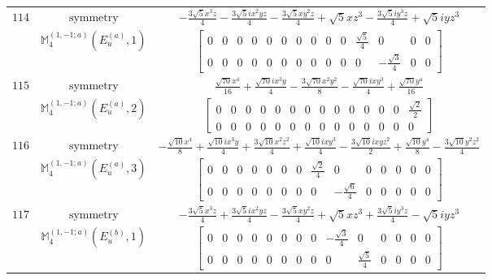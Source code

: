 \documentclass[fleqn,8pt,landscape]{jsarticle}
\begin{document}
\begin{longtable}{ccc}
$ 114 $ & $ \text{symmetry} $ & $ - \frac{3 \sqrt{5} x^{3} z}{4} - \frac{3 \sqrt{5} i x^{2} y z}{4} - \frac{3 \sqrt{5} x y^{2} z}{4} + \sqrt{5} x z^{3} - \frac{3 \sqrt{5} i y^{3} z}{4} + \sqrt{5} i y z^{3} $ \\
$  $ & $ \mathbb{M}_{4}^{(1,-1;a)}(E_{u}^{(a)},1) $ & $ \begin{bmatrix} 0 & 0 & 0 & 0 & 0 & 0 & 0 & 0 & 0 & 0 & \frac{\sqrt{5}}{4} & 0 & 0 & 0 \\ 0 & 0 & 0 & 0 & 0 & 0 & 0 & 0 & 0 & 0 & 0 & - \frac{\sqrt{3}}{4} & 0 & 0 \end{bmatrix} $ \\ \hline
$ 115 $ & $ \text{symmetry} $ & $ \frac{\sqrt{70} x^{4}}{16} + \frac{\sqrt{70} i x^{3} y}{4} - \frac{3 \sqrt{70} x^{2} y^{2}}{8} - \frac{\sqrt{70} i x y^{3}}{4} + \frac{\sqrt{70} y^{4}}{16} $ \\
$  $ & $ \mathbb{M}_{4}^{(1,-1;a)}(E_{u}^{(a)},2) $ & $ \begin{bmatrix} 0 & 0 & 0 & 0 & 0 & 0 & 0 & 0 & 0 & 0 & 0 & 0 & 0 & \frac{\sqrt{2}}{2} \\ 0 & 0 & 0 & 0 & 0 & 0 & 0 & 0 & 0 & 0 & 0 & 0 & 0 & 0 \end{bmatrix} $ \\ \hline
$ 116 $ & $ \text{symmetry} $ & $ - \frac{\sqrt{10} x^{4}}{8} + \frac{\sqrt{10} i x^{3} y}{4} + \frac{3 \sqrt{10} x^{2} z^{2}}{4} + \frac{\sqrt{10} i x y^{3}}{4} - \frac{3 \sqrt{10} i x y z^{2}}{2} + \frac{\sqrt{10} y^{4}}{8} - \frac{3 \sqrt{10} y^{2} z^{2}}{4} $ \\
$  $ & $ \mathbb{M}_{4}^{(1,-1;a)}(E_{u}^{(a)},3) $ & $ \begin{bmatrix} 0 & 0 & 0 & 0 & 0 & 0 & 0 & \frac{\sqrt{2}}{4} & 0 & 0 & 0 & 0 & 0 & 0 \\ 0 & 0 & 0 & 0 & 0 & 0 & 0 & 0 & - \frac{\sqrt{6}}{4} & 0 & 0 & 0 & 0 & 0 \end{bmatrix} $ \\ \hline
$ 117 $ & $ \text{symmetry} $ & $ - \frac{3 \sqrt{5} x^{3} z}{4} + \frac{3 \sqrt{5} i x^{2} y z}{4} - \frac{3 \sqrt{5} x y^{2} z}{4} + \sqrt{5} x z^{3} + \frac{3 \sqrt{5} i y^{3} z}{4} - \sqrt{5} i y z^{3} $ \\
$  $ & $ \mathbb{M}_{4}^{(1,-1;a)}(E_{u}^{(b)},1) $ & $ \begin{bmatrix} 0 & 0 & 0 & 0 & 0 & 0 & 0 & 0 & - \frac{\sqrt{3}}{4} & 0 & 0 & 0 & 0 & 0 \\ 0 & 0 & 0 & 0 & 0 & 0 & 0 & 0 & 0 & \frac{\sqrt{5}}{4} & 0 & 0 & 0 & 0 \end{bmatrix} $ \\ \hline

\end{longtable}
\end{document}
